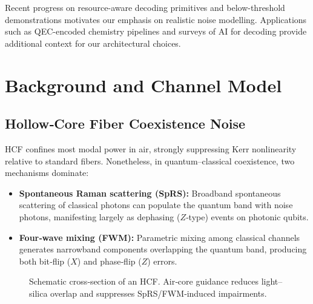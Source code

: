 \documentclass[conference]{IEEEtran}
\begin{document}
    Recent progress on resource-aware decoding primitives\cite{Locher2025}
    and below-threshold demonstrations\cite{BelowThreshold2024}
    motivates our emphasis on realistic noise modelling.  Applications such
    as QEC-encoded chemistry pipelines\cite{QECChemistry2025} and surveys of
    AI for decoding\cite{AIFQEC2024} provide additional context for our
    architectural choices.

    \section{Background and Channel Model}\label{sec:background}

    \subsection{Hollow‑Core Fiber Coexistence Noise}
    HCF confines most modal power in air, strongly suppressing Kerr nonlinearity relative to standard fibers.  
Nonetheless, in quantum–classical coexistence, two mechanisms dominate:

    \begin{itemize}[leftmargin=*,itemsep=1pt]
      \item \textbf{Spontaneous Raman scattering (SpRS):} Broadband spontaneous scattering of classical photons can 
populate the quantum band with noise photons, manifesting largely as dephasing ($Z$‑type) events on photonic qubits.
      \item \textbf{Four‑wave mixing (FWM):} Parametric mixing among classical channels generates narrowband components 
overlapping the quantum band, producing both bit‑flip ($X$) and phase‑flip ($Z$) errors.
    \end{itemize}

    \begin{figure}[t]
    \centering
    \caption{Schematic cross‑section of an HCF.  Air‑core guidance reduces light–silica overlap and suppresses 
SpRS/FWM‑induced impairments.}
    \label{fig:hcf}
    \end{figure}
\end{document}
